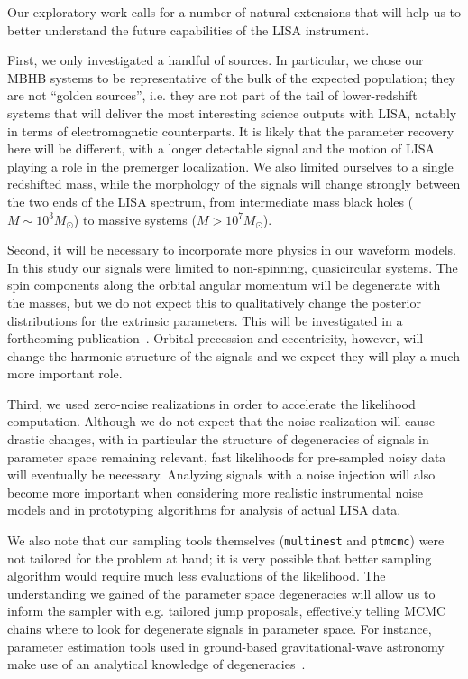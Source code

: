 \documentclass[aps,showpacs,twocolumn,prd,superscriptaddress,nofootinbib]{revtex4-1}
\begin{document}
Our exploratory work calls for a number of natural extensions that will help us to better understand the future capabilities of the LISA instrument.

First, we only investigated a handful of sources. In particular, we chose our MBHB systems to be representative of the bulk of the expected population; they are not ``golden sources'', i.e. they are not part of the tail of lower-redshift systems that will deliver the most interesting science outputs with LISA, notably in terms of electromagnetic counterparts. It is likely that the parameter recovery here will be different, with a longer detectable signal and the motion of LISA playing a role in the premerger localization. We also limited ourselves to a single redshifted mass, while the morphology of the signals will change strongly between the two ends of the LISA spectrum, from intermediate mass black holes ($M\sim 10^{3} M_{\odot}$) to massive systems ($M>10^{7} M_{\odot}$).

Second, it will be necessary to incorporate more physics in our waveform models.
In this study our signals were limited to non-spinning, quasicircular systems.
The spin components along the orbital angular momentum will be degenerate with the masses, but we do not expect this to qualitatively change the posterior distributions for the extrinsic parameters.
This will be investigated in a forthcoming publication~\cite{Katz+20}.
Orbital precession and eccentricity, however, will change the harmonic structure of the signals and we expect they will play a much more important role.

Third, we used zero-noise realizations in order to accelerate the likelihood computation.
Although we do not expect that the noise realization will cause drastic changes, with in particular the structure of degeneracies of signals in parameter space remaining relevant, fast likelihoods for pre-sampled noisy data will eventually be necessary.
Analyzing signals with a noise injection will also become more important when considering more realistic instrumental noise models and in prototyping algorithms for analysis of actual LISA data.

We also note that our sampling tools themselves (\texttt{multinest} and \texttt{ptmcmc}) were not tailored for the problem at hand; it is very possible that better sampling algorithm would require much less evaluations of the likelihood. The understanding we gained of the parameter space degeneracies will allow us to inform the sampler with e.g. tailored jump proposals, effectively telling MCMC chains where to look for degenerate signals in parameter space. For instance, parameter estimation tools used in ground-based gravitational-wave astronomy make use of an analytical knowledge of degeneracies~\cite{Veitch+14}.
\end{document}
